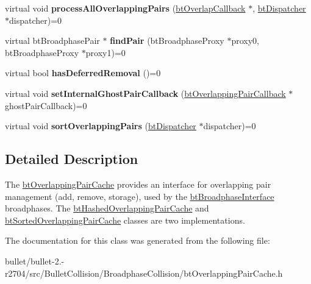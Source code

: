 \begin{DoxyCompactItemize}
\item 
\hypertarget{classbt_overlapping_pair_cache_a64d66749a8f8f1bd3bc877d4ac1371f3}{virtual void {\bfseries process\+All\+Overlapping\+Pairs} (\hyperlink{structbt_overlap_callback}{bt\+Overlap\+Callback} $\ast$, \hyperlink{classbt_dispatcher}{bt\+Dispatcher} $\ast$dispatcher)=0}\label{classbt_overlapping_pair_cache_a64d66749a8f8f1bd3bc877d4ac1371f3}

\item 
\hypertarget{classbt_overlapping_pair_cache_ac1054ce61178f557462e8d3840752d08}{virtual bt\+Broadphase\+Pair $\ast$ {\bfseries find\+Pair} (bt\+Broadphase\+Proxy $\ast$proxy0, bt\+Broadphase\+Proxy $\ast$proxy1)=0}\label{classbt_overlapping_pair_cache_ac1054ce61178f557462e8d3840752d08}

\item 
\hypertarget{classbt_overlapping_pair_cache_aec4b6f27f7a6f6ef39ff4e37cf3f4514}{virtual bool {\bfseries has\+Deferred\+Removal} ()=0}\label{classbt_overlapping_pair_cache_aec4b6f27f7a6f6ef39ff4e37cf3f4514}

\item 
\hypertarget{classbt_overlapping_pair_cache_ae6e64aa73906582205655edb1de9b4d5}{virtual void {\bfseries set\+Internal\+Ghost\+Pair\+Callback} (\hyperlink{classbt_overlapping_pair_callback}{bt\+Overlapping\+Pair\+Callback} $\ast$ghost\+Pair\+Callback)=0}\label{classbt_overlapping_pair_cache_ae6e64aa73906582205655edb1de9b4d5}

\item 
\hypertarget{classbt_overlapping_pair_cache_ac1d730243d65b184d3e9a5f0c8bc5f00}{virtual void {\bfseries sort\+Overlapping\+Pairs} (\hyperlink{classbt_dispatcher}{bt\+Dispatcher} $\ast$dispatcher)=0}\label{classbt_overlapping_pair_cache_ac1d730243d65b184d3e9a5f0c8bc5f00}

\end{DoxyCompactItemize}


\subsection{Detailed Description}
The \hyperlink{classbt_overlapping_pair_cache}{bt\+Overlapping\+Pair\+Cache} provides an interface for overlapping pair management (add, remove, storage), used by the \hyperlink{classbt_broadphase_interface}{bt\+Broadphase\+Interface} broadphases. The \hyperlink{classbt_hashed_overlapping_pair_cache}{bt\+Hashed\+Overlapping\+Pair\+Cache} and \hyperlink{classbt_sorted_overlapping_pair_cache}{bt\+Sorted\+Overlapping\+Pair\+Cache} classes are two implementations. 

The documentation for this class was generated from the following file\+:\begin{DoxyCompactItemize}
\item 
bullet/bullet-\/2.-\/r2704/src/\+Bullet\+Collision/\+Broadphase\+Collision/bt\+Overlapping\+Pair\+Cache.\+h\end{DoxyCompactItemize}
